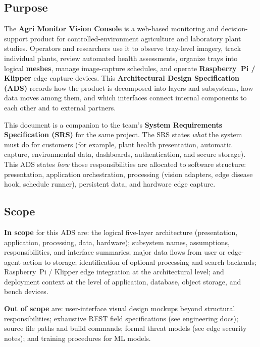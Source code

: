 \subsection{Purpose}

The \textbf{Agri Monitor Vision Console} is a web-based monitoring and decision-support product for controlled-environment agriculture and laboratory plant studies. Operators and researchers use it to observe tray-level imagery, track individual plants, review automated health assessments, organize trays into logical \textbf{meshes}, manage image-capture schedules, and operate \textbf{Raspberry~Pi / Klipper} edge capture devices. This \textbf{Architectural Design Specification (ADS)} records how the product is decomposed into layers and subsystems, how data moves among them, and which interfaces connect internal components to each other and to external partners.

This document is a companion to the team's \textbf{System Requirements Specification (SRS)} for the same project.\cite{srs} The SRS states \emph{what} the system must do for customers (for example, plant health presentation, automatic capture, environmental data, dashboards, authentication, and secure storage). This ADS states \emph{how} those responsibilities are allocated to software structure: presentation, application orchestration, processing (vision adapters, edge disease hook, schedule runner), persistent data, and hardware edge capture.

\subsection{Scope}

\textbf{In scope} for this ADS are: the logical five-layer architecture (presentation, application, processing, data, hardware); subsystem names, assumptions, responsibilities, and interface summaries; major data flows from user or edge-agent action to storage; identification of optional processing and search backends; Raspberry~Pi / Klipper edge integration at the architectural level; and deployment context at the level of application, database, object storage, and bench devices.\cite{edgeops}

\textbf{Out of scope} are: user-interface visual design mockups beyond structural responsibilities; exhaustive REST field specifications (see engineering docs); source file paths and build commands; formal threat models (see edge security notes); and training procedures for ML models.

